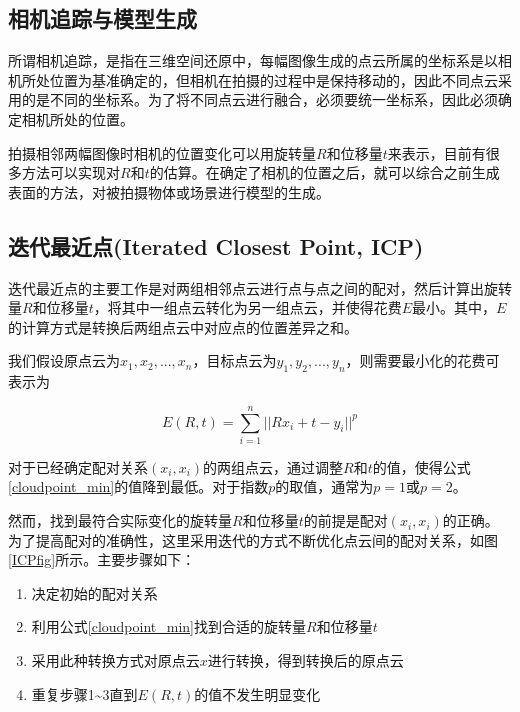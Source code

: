 \documentclass{llncs}
\begin{document}
\begin{CJK}{UTF8}{song}
\section{相机追踪与模型生成}

所谓相机追踪，是指在三维空间还原中，每幅图像生成的点云所属的坐标系是以相机所处位置为基准确定的，但相机在拍摄的过程中是保持移动的，因此不同点云采用的是不同的坐标系。为了将不同点云进行融合，必须要统一坐标系，因此必须确定相机所处的位置。

拍摄相邻两幅图像时相机的位置变化可以用旋转量$R$和位移量$t$来表示，目前有很多方法可以实现对$R$和$t$的估算。在确定了相机的位置之后，就可以综合之前生成表面的方法，对被拍摄物体或场景进行模型的生成。

	\subsection{迭代最近点(Iterated Closest Point, ICP)}

迭代最近点的主要工作是对两组相邻点云进行点与点之间的配对，然后计算出旋转量$R$和位移量$t$，将其中一组点云转化为另一组点云，并使得花费$E$最小\cite{DBLP:journals/pami/BeslM92}。其中，$E$的计算方式是转换后两组点云中对应点的位置差异之和。

我们假设原点云为$x_1,x_2,...,x_n$，目标点云为$y_1,y_2,...,y_n$，则需要最小化的花费可表示为

\begin{equation}
\label{cloudpoint_min}
	E(R,t) = \sum_{i=1}^n||Rx_i+t-y_i||^p
\end{equation}

对于已经确定配对关系$(x_i,x_i)$的两组点云，通过调整$R$和$t$的值，使得公式\ref{cloudpoint_min}的值降到最低。对于指数$p$的取值，通常为$p=1$或$p=2$。

然而，找到最符合实际变化的旋转量$R$和位移量$t$的前提是配对$(x_i,x_i)$的正确。为了提高配对的准确性，这里采用迭代的方式不断优化点云间的配对关系，如图\ref{ICPfig}所示。主要步骤如下：

\begin{enumerate}
\item{决定初始的配对关系}
\item{利用公式\ref{cloudpoint_min}找到合适的旋转量$R$和位移量$t$}
\item{采用此种转换方式对原点云$x$进行转换，得到转换后的原点云}
\item{重复步骤1\~{}3直到$E(R,t)$的值不发生明显变化}
\end{enumerate}


\end{CJK}
\end{document}
